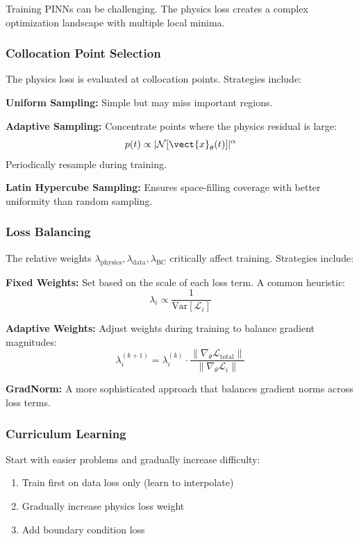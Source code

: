 Training PINNs can be challenging. The physics loss creates a complex optimization landscape with multiple local minima.

\subsubsection{Collocation Point Selection}

The physics loss is evaluated at collocation points. Strategies include:

\textbf{Uniform Sampling:} Simple but may miss important regions.

\textbf{Adaptive Sampling:} Concentrate points where the physics residual is large:
\begin{equation}
p(t) \propto |\mathcal{N}[\vect{x}_\theta(t)]|^\alpha
\end{equation}
Periodically resample during training.

\textbf{Latin Hypercube Sampling:} Ensures space-filling coverage with better uniformity than random sampling.

\subsubsection{Loss Balancing}

The relative weights $\lambda_{\text{physics}}, \lambda_{\text{data}}, \lambda_{\text{BC}}$ critically affect training. Strategies include:

\textbf{Fixed Weights:} Set based on the scale of each loss term. A common heuristic:
\begin{equation}
\lambda_i \propto \frac{1}{\text{Var}[\mathcal{L}_i]}
\end{equation}

\textbf{Adaptive Weights:} Adjust weights during training to balance gradient magnitudes:
\begin{equation}
\lambda_i^{(k+1)} = \lambda_i^{(k)} \cdot \frac{\|\nabla_\theta \mathcal{L}_{\text{total}}\|}{\|\nabla_\theta \mathcal{L}_i\|}
\end{equation}

\textbf{GradNorm:} A more sophisticated approach that balances gradient norms across loss terms.

\subsubsection{Curriculum Learning}

Start with easier problems and gradually increase difficulty:
\begin{enumerate}
    \item Train first on data loss only (learn to interpolate)
    \item Gradually increase physics loss weight
    \item Add boundary condition loss
\end{enumerate}

